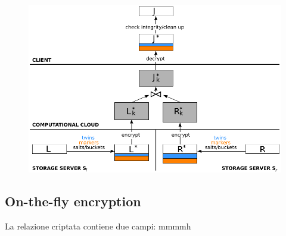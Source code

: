 \documentclass{report}
\begin{document}
\begin{figure}[H]
    \centering
    \includegraphics[width=1\linewidth]{images/join.png}
\end{figure}

\subsection{On-the-fly encryption}
La relazione criptata contiene due campi:
mmmmh
\end{document}
